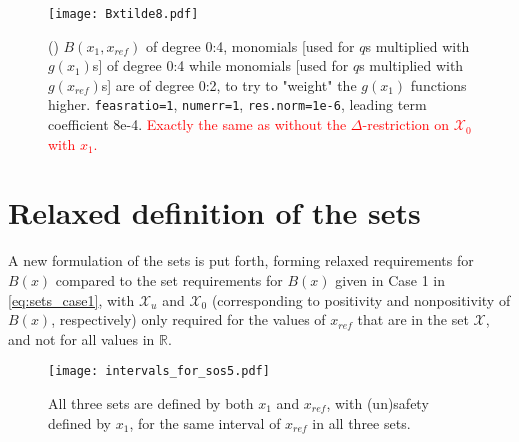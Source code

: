 \begin{figure}[h]
\centering\texttt{[image: Bxtilde8.pdf]}
\caption{() $B(x_1,x_{ref})$ of degree 0:4,  monomials [used for $q$s multiplied with $g(x_1)$s] of degree 0:4 while monomials [used for $q$s multiplied with $g(x_{ref})$s] are of degree 0:2, to try to "weight" the $g(x_1)$ functions higher. \texttt{feasratio=1}, \texttt{numerr=1}, \texttt{res.norm=1e-6}, leading term coefficient 8e-4. \textcolor{red}{Exactly the same as without the $\Delta$-restriction on $\mathcal{X}_0$ with $x_1$.}}
\label{fig:Bxtilde8}
\end{figure}

\newpage
\section{Relaxed definition of the sets}
A new formulation of the sets is put forth, forming relaxed requirements for $B(x)$ compared to the set requirements for $B(x)$ given in Case 1 in \autoref{eq:sets_case1}, with $\mathcal{X}_u$ and $\mathcal{X}_0$ (corresponding to positivity and nonpositivity of $B(x)$, respectively) only required for the values of $x_{ref}$ that are in the set $\mathcal{X}$, and not for all values in $\mathbb{R}$.
\begin{figure}[htbp]
	\centering\texttt{[image: intervals\_for\_sos5.pdf]}
	\caption{All three sets are defined by both $x_1$ and $x_{ref}$, with (un)safety defined by $x_1$, for the same interval of $x_{ref}$ in all three sets.}
	\label{fig:intervals_for_sos5}
\end{figure}

